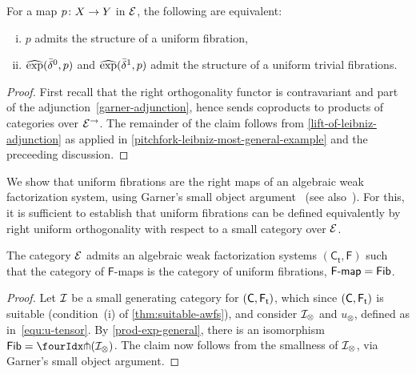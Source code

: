\documentclass[reqno,10pt,a4paper,oneside,draft]{amsart}
\begin{document}
{{\begin{proposition} \label{prod-exp-general}
For a map $p \co X \to Y$ in $\catE$, the following are equivalent:
\begin{enumerate}[(i)]
\item $p$ admits the structure of a uniform fibration,
\item $\hatexp(\bar{\delta}^0, p)$ and $\hatexp(\bar{\delta}^1, p)$ admit the structure of a uniform trivial fibrations.
\end{enumerate}
\end{proposition}

\begin{proof}
First recall that the right orthogonality functor is contravariant and part of the adjunction~\eqref{garner-adjunction}, hence sends coproducts to products of categories over $\catE^\to$.
The remainder of the claim follows from \cref{lift-of-leibniz-adjunction} as applied in \cref{pitchfork-leibniz-most-general-example} and the preceeding discussion.
\end{proof}



We show that uniform fibrations are the right maps of an algebraic weak factorization system, using Garner's small object argument~\cite{garner:small-object-argument} (see also~\cite[Proposition~16]{bourke-garner-I}). For this, it is sufficient to establish
that uniform fibrations can be defined equivalently by right uniform orthogonality with respect to a small category over $\catE$.




\newcommand{\TC}{\mathsf{C_t}}
\newcommand{\FF}{\mathsf{F}}



\begin{theorem} \label{thm:sset-cset-nwfs} The category $\cal{E}$ admits an algebraic weak factorization systems $(\TC, \FF)$ such that  the category of $\mathsf{F}$-maps is the category of uniform fibrations, \ie $\palg{\mathsf{F}} = \Fib$.
\end{theorem}

\begin{proof} Let $\cal{I}$ be a small generating category for $(\CC, \TF)$, which since 
$(\CC, \TF)$ is suitable (condition~(i) of \cref{thm:suitable-awfs}), and consider $\cal{I}_\otimes$ and $u_\otimes$, defined as in~\eqref{equ:u-tensor}.
By \cref{prod-exp-general}, there is an isomorphism $\Fib  = \liftr{(\cal{I}_\otimes)}$. The claim now follows 
from the smallness of  $\cal{I}_\otimes$, via Garner's small object argument.
\end{proof}


}}
\end{document}
